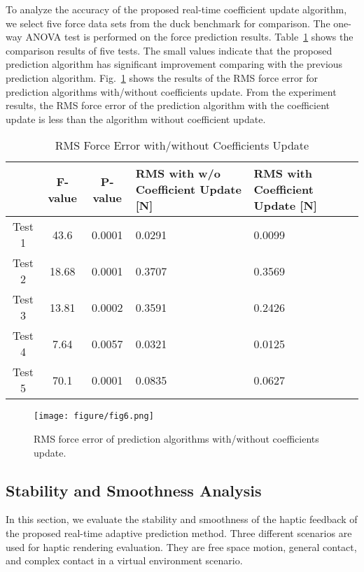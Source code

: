 \documentclass[10pt,journal,cspaper,compsoc]{IEEEtran}
\begin{document}
To analyze the accuracy of the proposed real-time coefficient update algorithm, we select five force data sets from the duck benchmark for comparison. The one-way ANOVA test is performed on the force prediction results. Table~\ref{table:2} shows the comparison results of five tests. The small  values indicate that the proposed prediction algorithm has significant improvement comparing with the previous prediction algorithm. Fig.~\ref{fig:forceError} shows the results of the RMS force error for prediction algorithms with/without coefficients update. From the experiment results, the RMS force error of the prediction algorithm with the coefficient update is less than the algorithm without coefficient update.
\begin{table}
	\caption{RMS Force Error with/without Coefficients Update}
	\begin{center}
		\begin{tabular}[c]{ c|c|c|m{}|m{} }
			\hline
			& F-value&	P-value&	RMS with w/o Coefficient Update [N]&  RMS with Coefficient Update [N]\\ \hline
			Test 1&	43.6&	0.0001&	0.0291&	0.0099\\
			Test 2&	18.68&	0.0001&	0.3707&	0.3569\\
			Test 3&	13.81&	0.0002&	0.3591&	0.2426\\
			Test 4&	7.64&	0.0057&	0.0321&	0.0125\\
			Test 5&	70.1&	0.0001&	0.0835&	0.0627\\
			\hline
		\end{tabular}
		\label{table:2}
	\end{center}
\end{table}
\begin{figure}[!t]
	\centering
	\texttt{[image: figure/fig6.png]}
	\caption{RMS force error of prediction algorithms with/without coefficients update.}
	\label{fig:forceError}
\end{figure}



\subsection{Stability and Smoothness Analysis}

In this section, we evaluate the stability and smoothness of the haptic feedback of the proposed real-time adaptive prediction method. Three different scenarios are used for haptic rendering evaluation. They are free space motion, general contact, and complex contact in a virtual environment scenario.
\end{document}
